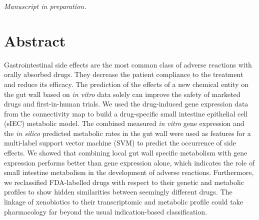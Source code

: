 { \textit{Manuscript in preparation.} \par}%
\section*{Abstract}
{  
Gastrointestinal side effects are the most common class of adverse reactions with orally absorbed drugs. They decrease the patient compliance to the treatment and reduce its efficacy. The prediction of the effects of a new chemical entity on the gut wall based on \textit{in vitro} data solely can improve the safety of marketed drugs and first-in-human trials. We used the drug-induced gene expression data from the connectivity map to build a drug-specific small intestine epithelial cell (sIEC) metabolic model. The combined measured \textit{in vitro} gene expression and the \textit{in silico} predicted metabolic rates in the gut wall were used as features for a multi-label support vector machine (SVM) to predict the occurrence of side effects. We showed that combining local gut wall specific metabolism with gene expression performs better than gene expression alone, which indicates the role of small intestine metabolism in the development of adverse reactions. Furthermore, we reclassified FDA-labelled drugs with respect to their genetic and metabolic profiles to show hidden similarities between seemingly different drugs. The linkage of xenobiotics to their transcriptomic and metabolic profile could take pharmacology far beyond the usual indication-based classification.
\par}%

\newpage
